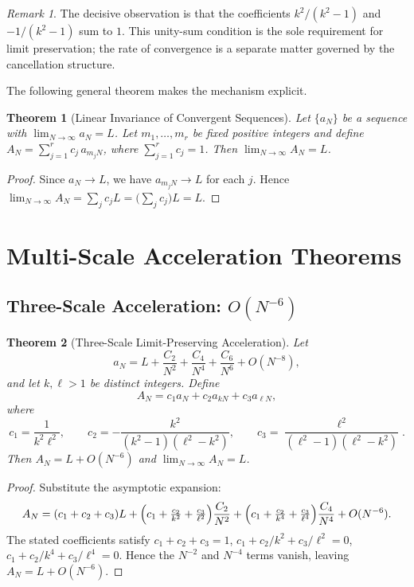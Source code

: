 \documentclass[12pt]{article}
\newtheorem{theorem}{Theorem}[section]
\theoremstyle{remark}
\newtheorem{remark}{Remark}[section]
\begin{document}
\begin{remark}
The decisive observation is that the coefficients $k^2/(k^2-1)$ and
$-1/(k^2-1)$ sum to $1$. This unity-sum condition is the sole requirement
for limit preservation; the rate of convergence is a separate matter
governed by the cancellation structure.
\end{remark}

The following general theorem makes the mechanism explicit.

\begin{theorem}[Linear Invariance of Convergent Sequences]
\label{thm:linear-invariance}
Let $\{a_N\}$ be a sequence with $\lim_{N\to\infty}a_N = L$.
Let $m_1,\dots,m_r$ be fixed positive integers and define
$A_N = \sum_{j=1}^r c_j\,a_{m_jN}$,
where $\sum_{j=1}^r c_j = 1$.
Then $\lim_{N\to\infty}A_N = L$.
\end{theorem}

\begin{proof}
Since $a_N \to L$, we have $a_{m_jN} \to L$ for each $j$.
Hence $\lim_{N\to\infty}A_N = \sum_j c_j L = \bigl(\sum_j c_j\bigr)L = L$.
\end{proof}

\section{Multi-Scale Acceleration Theorems}

\subsection{Three-Scale Acceleration: $O(N^{-6})$}

\begin{theorem}[Three-Scale Limit-Preserving Acceleration]
\label{thm:three-scale}
Let
\[
  a_N = L + \frac{C_2}{N^2} + \frac{C_4}{N^4} + \frac{C_6}{N^6}
        + O(N^{-8}),
\]
and let $k, \ell > 1$ be distinct integers. Define
\[
  A_N = c_1 a_N + c_2 a_{kN} + c_3 a_{\ell N},
\]
where
\[
  c_1 = \frac{1}{k^2\ell^2},\qquad
  c_2 = -\frac{k^2}{(k^2-1)(\ell^2-k^2)},\qquad
  c_3 = \frac{\ell^2}{(\ell^2-1)(\ell^2-k^2)}.
\]
Then $A_N = L + O(N^{-6})$ and $\lim_{N\to\infty}A_N = L$.
\end{theorem}

\begin{proof}
Substitute the asymptotic expansion:
\[
  A_N = (c_1+c_2+c_3)L
      + \Bigl(c_1+\tfrac{c_2}{k^2}+\tfrac{c_3}{\ell^2}\Bigr)\frac{C_2}{N^2}
      + \Bigl(c_1+\tfrac{c_2}{k^4}+\tfrac{c_3}{\ell^4}\Bigr)\frac{C_4}{N^4}
      + O(N^{-6}).
\]
The stated coefficients satisfy
$c_1+c_2+c_3=1$,
$c_1+c_2/k^2+c_3/\ell^2=0$,
$c_1+c_2/k^4+c_3/\ell^4=0$.
Hence the $N^{-2}$ and $N^{-4}$ terms vanish, leaving $A_N = L+O(N^{-6})$.
\end{proof}
\end{document}
